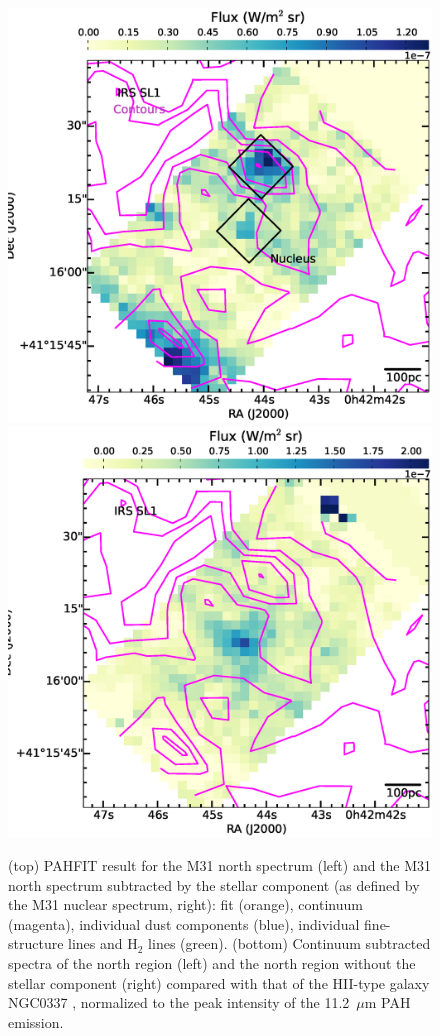 \begin{figure}
\centering
\includegraphics[width = 8 cm]{./fig13a.eps}
\includegraphics[width = 8 cm]{./fig13b.eps}
\caption{(top) PAHFIT result for the M31 north spectrum (left) and the M31 north spectrum subtracted by the stellar component (as defined by the M31 nuclear spectrum, right): fit (orange), continuum (magenta), individual dust components (blue), individual fine-structure lines and H$_2$ lines (green). (bottom) Continuum subtracted spectra of the north region (left) and the north region without the stellar component (right) compared with that of the HII-type galaxy NGC0337 \citep{Smith:2007lr}, normalized to the peak intensity of the  11.2~$\mu$m PAH emission. }
\label{fig:nuc_pahfit}
\end{figure}

